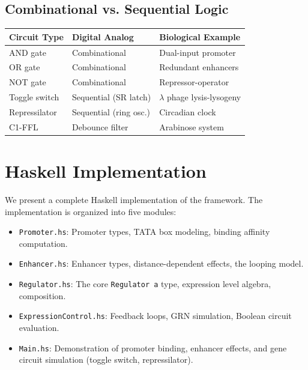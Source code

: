 \documentclass[12pt,a4paper]{article}
\begin{document}
\subsection{Combinational vs. Sequential Logic}

\begin{center}
\begin{tabular}{lll}
\toprule
\textbf{Circuit Type} & \textbf{Digital Analog} & \textbf{Biological Example} \\
\midrule
AND gate & Combinational & Dual-input promoter \\
OR gate & Combinational & Redundant enhancers \\
NOT gate & Combinational & Repressor-operator \\
Toggle switch & Sequential (SR latch) & $\lambda$ phage lysis-lysogeny \\
Repressilator & Sequential (ring osc.) & Circadian clock \\
C1-FFL & Debounce filter & Arabinose system \\
\bottomrule
\end{tabular}
\end{center}


\section{Haskell Implementation}\label{sec:implementation}

We present a complete Haskell implementation of the framework.  The implementation is organized into five modules:

\begin{itemize}
  \item \texttt{Promoter.hs}: Promoter types, TATA box modeling, binding affinity computation.
  \item \texttt{Enhancer.hs}: Enhancer types, distance-dependent effects, the looping model.
  \item \texttt{Regulator.hs}: The core \texttt{Regulator a} type, expression level algebra, composition.
  \item \texttt{ExpressionControl.hs}: Feedback loops, GRN simulation, Boolean circuit evaluation.
  \item \texttt{Main.hs}: Demonstration of promoter binding, enhancer effects, and gene circuit simulation (toggle switch, repressilator).
\end{itemize}
\end{document}
